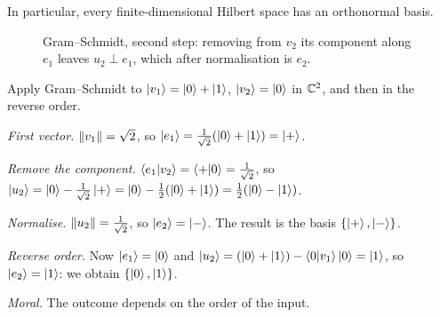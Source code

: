 In particular, every finite-dimensional Hilbert space has an orthonormal basis.

\begin{figure}[htb]
  \centering
  \caption{Gram--Schmidt, second step: removing from $v_2$ its component along $e_1$ leaves $u_2\perp e_1$, which after normalisation is $e_2$.}
  \label{fig:gs}
\end{figure}

\begin{example}\label{ex:gs-c2}
  Apply Gram--Schmidt to $\left|v_1\right\rangle=\left|0\right\rangle+\left|1\right\rangle$, $\left|v_2\right\rangle=\left|0\right\rangle$ in $\mathbb{C}^2$, and then in the reverse order.
\end{example}
\begin{solution}
  \begin{steps}
    \item \emph{First vector.} $\left\|v_1\right\|=\sqrt2$, so $\left|e_1\right\rangle=\frac1{\sqrt2}(\left|0\right\rangle+\left|1\right\rangle)=\left|+\right\rangle$.
    \item \emph{Remove the component.} $\left\langle e_1\middle|v_2\right\rangle=\left\langle+\middle|0\right\rangle=\tfrac1{\sqrt2}$, so $\left|u_2\right\rangle=\left|0\right\rangle-\tfrac1{\sqrt2}\left|+\right\rangle=\left|0\right\rangle-\tfrac12(\left|0\right\rangle+\left|1\right\rangle)=\tfrac12(\left|0\right\rangle-\left|1\right\rangle)$.
    \item \emph{Normalise.} $\left\|u_2\right\|=\tfrac1{\sqrt2}$, so $\left|e_2\right\rangle=\left|-\right\rangle$. The result is the basis $\{\left|+\right\rangle,\left|-\right\rangle\}$.
    \item \emph{Reverse order.} Now $\left|e_1\right\rangle=\left|0\right\rangle$ and $\left|u_2\right\rangle=(\left|0\right\rangle+\left|1\right\rangle)-\left\langle0\middle|v_1\right\rangle\left|0\right\rangle=\left|1\right\rangle$, so $\left|e_2\right\rangle=\left|1\right\rangle$: we obtain $\{\left|0\right\rangle,\left|1\right\rangle\}$.
    \item \emph{Moral.} The outcome depends on the order of the input.
  \end{steps}
\end{solution}

